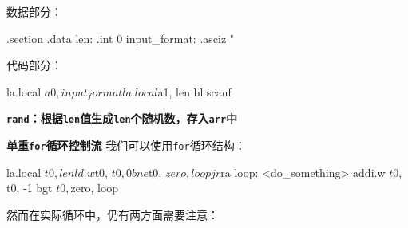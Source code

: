数据部分：

\begin{CodeBlock}[language=BookLoongArch]
.section .data
len: .int 0
input_format: .asciz "%
\end{CodeBlock}

代码部分：

\begin{CodeBlock}[language=BookLoongArch]
    la.local    $a0, input_format
    la.local    $a1, len
    bl          scanf
\end{CodeBlock}

\textbf{\texttt{rand}：根据\texttt{len}值生成\texttt{len}个随机数，存入\texttt{arr}中}

\textbf{单重\texttt{for}循环控制流} 我们可以使用\texttt{for}循环结构：

\begin{CodeBlock}[language=BookLoongArch]
 		la.local    $t0, len
    ld.w        $t0, $t0, 0
    bne         $t0, $zero, loop
    jr          $ra
loop:
    <do_something>
    addi.w      $t0, $t0, -1
    bgt         $t0, $zero, loop
\end{CodeBlock}

然而在实际循环中，仍有两方面需要注意：

